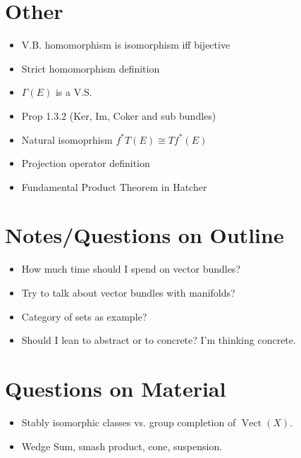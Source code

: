 \documentclass[12]{amsart}
\DeclareMathOperator{\vect}{Vect}
\begin{document}
\section{Other}

\begin{itemize}
    \item V.B. homomorphism is isomorphism iff bijective
    \item Strict homomorphism definition
    \item $\Gamma(E)$ is a V.S.
    \item Prop 1.3.2 (Ker, Im, Coker and sub bundles)
    \item Natural isomoprhism $f^*T(E) \cong Tf^*(E)$
    \item Projection operator definition
    \item Fundamental Product Theorem in Hatcher
\end{itemize}

\section{Notes/Questions on Outline}
\begin{itemize}
    \item How much time should I spend on vector bundles?
    \item Try to talk about vector bundles with manifolds?
    \item Category of sets as example?
    \item Should I lean to abstract or to concrete? I'm thinking concrete.
\end{itemize}

\section{Questions on Material}
\begin{itemize}
    \item Stably isomorphic classes vs. group completion of $\vect(X)$.
    \item Wedge Sum, smash product, cone, suspension.
\end{itemize}
\end{document}

